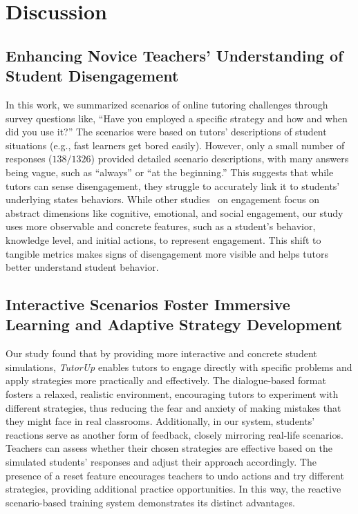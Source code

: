 \section{Discussion}

\subsection{Enhancing Novice Teachers' Understanding of Student Disengagement}
\label{subsec:enhancing_understanding}

In this work, we summarized scenarios of online tutoring challenges through survey questions like, ``Have you employed a specific strategy and how and when did you use it?'' The scenarios were based on tutors' descriptions of student situations (e.g., fast learners get bored easily). However, only a small number of responses ($138/1326$) provided detailed scenario descriptions, with many answers being vague, such as ``always'' or ``at the beginning.'' This suggests that while tutors can sense disengagement, they struggle to accurately link it to students' underlying states behaviors. While other studies~\cite{fredricks2004school,joshi2022behavioral} on engagement focus on abstract dimensions like cognitive, emotional, and social engagement, our study uses more observable and concrete features, such as a student’s behavior, knowledge level, and initial actions, to represent engagement. This shift to tangible metrics makes signs of disengagement more visible and helps tutors better understand student behavior.



\subsection{Interactive Scenarios Foster Immersive Learning and Adaptive Strategy Development}

Our study found that by providing more interactive and concrete student simulations, \textit{TutorUp} enables tutors to engage directly with specific problems and apply strategies more practically and effectively. The dialogue-based format fosters a relaxed, realistic environment, encouraging tutors to experiment with different strategies, thus reducing the fear and anxiety of making mistakes that they might face in real classrooms.
%
Additionally, in our system, students' reactions serve as another form of feedback, closely mirroring real-life scenarios. Teachers can assess whether their chosen strategies are effective based on the simulated students' responses and adjust their approach accordingly. The presence of a reset feature encourages teachers to undo actions and try different strategies, providing additional practice opportunities. In this way, the reactive scenario-based training system demonstrates its distinct advantages.

